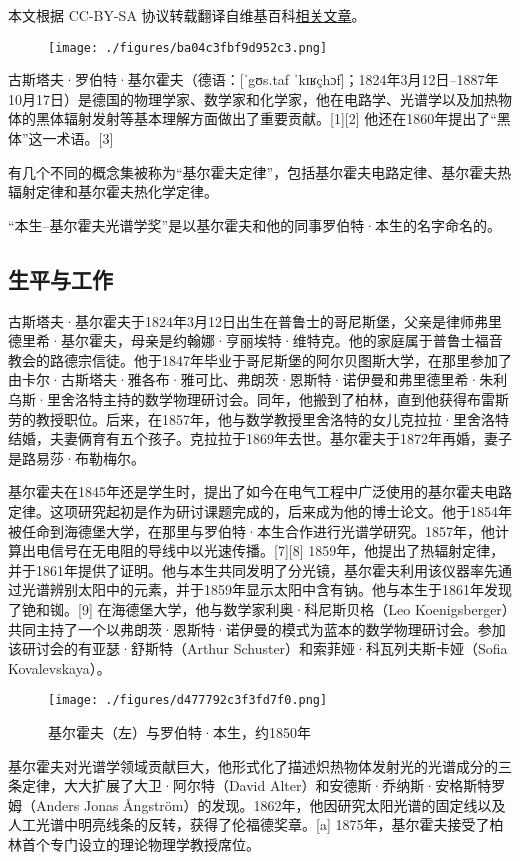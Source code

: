 
本文根据 CC-BY-SA 协议转载翻译自维基百科\href{https://en.wikipedia.org/wiki/Gustav_Kirchhoff}{相关文章}。

\begin{figure}[ht]
\centering
\texttt{[image: ./figures/ba04c3fbf9d952c3.png]}
\caption{} \label{fig_JRHF_1}
\end{figure}
古斯塔夫·罗伯特·基尔霍夫（德语：[ˈgʊs.taf ˈkɪʁçhɔf]；1824年3月12日–1887年10月17日）是德国的物理学家、数学家和化学家，他在电路学、光谱学以及加热物体的黑体辐射发射等基本理解方面做出了重要贡献。[1][2] 他还在1860年提出了“黑体”这一术语。[3]

有几个不同的概念集被称为“基尔霍夫定律”，包括基尔霍夫电路定律、基尔霍夫热辐射定律和基尔霍夫热化学定律。

“本生–基尔霍夫光谱学奖”是以基尔霍夫和他的同事罗伯特·本生的名字命名的。
\subsection{生平与工作}  
古斯塔夫·基尔霍夫于1824年3月12日出生在普鲁士的哥尼斯堡，父亲是律师弗里德里希·基尔霍夫，母亲是约翰娜·亨丽埃特·维特克。他的家庭属于普鲁士福音教会的路德宗信徒。他于1847年毕业于哥尼斯堡的阿尔贝图斯大学，在那里参加了由卡尔·古斯塔夫·雅各布·雅可比、弗朗茨·恩斯特·诺伊曼和弗里德里希·朱利乌斯·里舍洛特主持的数学物理研讨会。同年，他搬到了柏林，直到他获得布雷斯劳的教授职位。后来，在1857年，他与数学教授里舍洛特的女儿克拉拉·里舍洛特结婚，夫妻俩育有五个孩子。克拉拉于1869年去世。基尔霍夫于1872年再婚，妻子是路易莎·布勒梅尔。

基尔霍夫在1845年还是学生时，提出了如今在电气工程中广泛使用的基尔霍夫电路定律。这项研究起初是作为研讨课题完成的，后来成为他的博士论文。他于1854年被任命到海德堡大学，在那里与罗伯特·本生合作进行光谱学研究。1857年，他计算出电信号在无电阻的导线中以光速传播。[7][8] 1859年，他提出了热辐射定律，并于1861年提供了证明。他与本生共同发明了分光镜，基尔霍夫利用该仪器率先通过光谱辨别太阳中的元素，并于1859年显示太阳中含有钠。他与本生于1861年发现了铯和铷。[9] 在海德堡大学，他与数学家利奥·科尼斯贝格（Leo Koenigsberger）共同主持了一个以弗朗茨·恩斯特·诺伊曼的模式为蓝本的数学物理研讨会。参加该研讨会的有亚瑟·舒斯特（Arthur Schuster）和索菲娅·科瓦列夫斯卡娅（Sofia Kovalevskaya）。
\begin{figure}[ht]
\centering
\texttt{[image: ./figures/d477792c3f3fd7f0.png]}
\caption{基尔霍夫（左）与罗伯特·本生，约1850年} \label{fig_JRHF_2}
\end{figure}
基尔霍夫对光谱学领域贡献巨大，他形式化了描述炽热物体发射光的光谱成分的三条定律，大大扩展了大卫·阿尔特（David Alter）和安德斯·乔纳斯·安格斯特罗姆（Anders Jonas Ångström）的发现。1862年，他因研究太阳光谱的固定线以及人工光谱中明亮线条的反转，获得了伦福德奖章。[a] 1875年，基尔霍夫接受了柏林首个专门设立的理论物理学教授席位。

